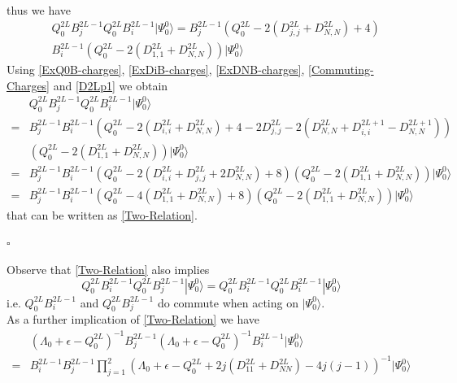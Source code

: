 \documentclass[10pt]{article}
\numberwithin{equation}{section}
\numberwithin{equation}{subsection}
\begin{document}
\begin{itemize}
\begin{align}
\end{align} 
thus we have 
\begin{align}
 &Q_{0}^{2L}B_{j}^{2L-1}Q_{0}^{2L}B_{i}^{2L-1}|\Psi_{0}^{0}\rangle=B_{j}^{2L-1}\left(Q_{0}^{2L}-2(D_{j,j}^{2L}+D_{N,N}^{2L})+4\right)\nonumber\\&B_{i}^{2L-1}\left(Q_{0}^{2L}-2(D_{1,1}^{2L}+D_{N,N}^{2L})\right)|\Psi_{0}^{0}\rangle
\end{align}
Using \eqref{ExQ0B-charges}, \eqref{ExDiB-charges}, \eqref{ExDNB-charges}, \eqref{Commuting-Charges} and \eqref{D2Lp1} we obtain 
\begin{align}
	&Q_{0}^{2L}B_{j}^{2L-1}Q_{0}^{2L}B_{i}^{2L-1}|\Psi_{0}^{0}\rangle\nonumber\\=&B_{j}^{2L-1}B_{i}^{2L-1}\left(Q_{0}^{2L}-2(D_{i,i}^{2L}+D_{N,N}^{2L})+4-2D_{j,j}^{2L}-2(D_{N,N}^{2L}+D_{i,i}^{2L+1}-D_{N,N}^{2L+1})\right)\nonumber\\&\left(Q_{0}^{2L}-2(D_{1,1}^{2L}+D_{N,N}^{2L})\right)|\Psi_{0}^{0}\rangle\nonumber
	\\=&
	B_{j}^{2L-1}B_{i}^{2L-1}\left(Q_{0}^{2L}-2(D_{i,i}^{2L}+D_{j,j}^{2L}+2D_{N,N}^{2L})+8\right)\left(Q_{0}^{2L}-2(D_{1,1}^{2L}+D_{N,N}^{2L})\right)|\Psi_{0}^{0}\rangle\nonumber
	\\=&
	B_{j}^{2L-1}B_{i}^{2L-1}\left(Q_{0}^{2L}-4(D_{1,1}^{2L}+D_{N,N}^{2L})+8\right)\left(Q_{0}^{2L}-2(D_{1,1}^{2L}+D_{N,N}^{2L})\right)|\Psi_{0}^{0}\rangle
\end{align}
that can be written as \eqref{Two-Relation}. 
\end{itemize}
\begin{flushright}
	$\square$
\end{flushright}
Observe that \eqref{Two-Relation} also implies
\begin{equation}\label{Commutativity-Gained}
	Q_{0}^{2L}B_{i}^{2L-1}Q_{0}^{2L}B_{j}^{2L-1}|\Psi_{0}^{0}\rangle=Q_{0}^{2L}B_{i}^{2L-1}Q_{0}^{2L}B_{i}^{2L-1}|\Psi_{0}^{0}\rangle
\end{equation}
i.e. $Q_{0}^{2L}B_{i}^{2L-1}$ and $Q_{0}^{2L}B_{j}^{2L-1}$ do commute when acting on $|\Psi_{0}^{0}\rangle$.\\
As a further implication of \eqref{Two-Relation} we have
\begin{align}\label{Two-Points-m1}
	&\left(\Lambda_{0}+\epsilon-Q_{0}^{2L}\right)^{-1}B_{j}^{2L-1}\left(\Lambda_{0}+\epsilon-Q_{0}^{2L}\right)^{-1}B_{i}^{2L-1}|\Psi_{0}^{0}\rangle\nonumber
	\\=&
	B_{i}^{2L-1}B_{j}^{2L-1}\prod_{j=1}^{2}\left(\Lambda_{0}+\epsilon-Q_{0}^{2L}+2j(D_{11}^{2L}+D_{NN}^{2L})-4j(j-1)\right)^{-1}|\Psi_{0}^{0}\rangle
\end{align}
\end{document}

